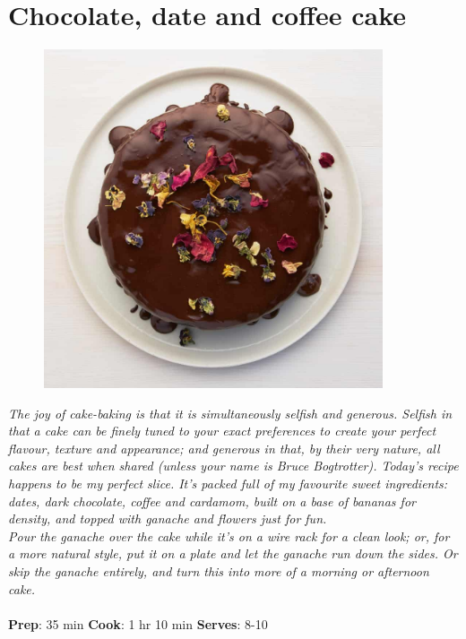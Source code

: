 \documentclass{book}
\begin{document}
\section{Chocolate, date and coffee cake}
\begin{figure}
\centering\includegraphics[width=10cm,height=10cm,keepaspectratio]{Recipe_Pictures/Chocolate,_date_and_coffee_cake.png}
\end{figure}
\emph{The joy of cake-baking is that it is simultaneously selfish and generous. Selfish in that a cake can be finely tuned to your exact preferences to create your perfect flavour, texture and appearance; and generous in that, by their very nature, all cakes are best when shared (unless your name is Bruce Bogtrotter). Today’s recipe happens to be my perfect slice. It’s packed full of my favourite sweet ingredients: dates, dark chocolate, coffee and cardamom, built on a base of bananas for density, and topped with ganache and flowers just for fun.\\ 
Pour the ganache over the cake while it’s on a wire rack for a clean look; or, for a more natural style, put it on a plate and let the ganache run down the sides. Or skip the ganache entirely, and turn this into more of a morning or afternoon cake.}\\\\ 
\textbf{Prep}: 35 min
\textbf{Cook}: 1 hr 10 min
\textbf{Serves}: 8-10
\end{document}
